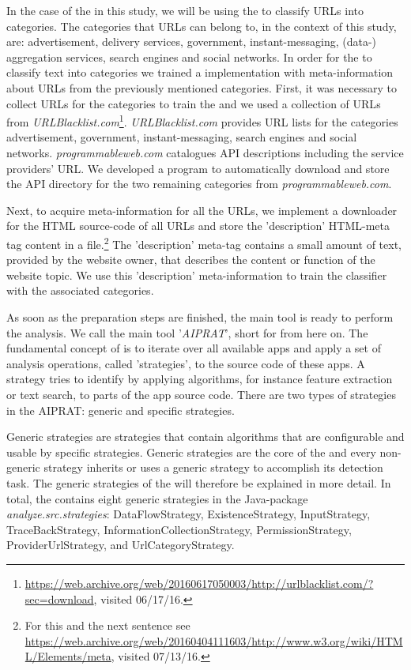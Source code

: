 In the case of the \sca in this study, we will be using the \nbc to classify URLs into categories.
The categories that URLs can belong to, in the context of this study, are: advertisement, delivery services, government, instant-messaging, (data-) aggregation services, search engines and social networks.
In order for the \nbc to classify text into categories we trained a \nbc implementation with meta-information about URLs from the previously mentioned categories.
First, it was necessary to collect URLs for the categories to train the \nbc and we used a collection of \acs{URL}s from \textit{URLBlacklist.com}\footnote{\url{https://web.archive.org/web/20160617050003/http://urlblacklist.com/?sec=download}, visited 06/17/16.}.
\textit{URLBlacklist.com} provides URL lists for the categories advertisement, government, instant-messaging, search engines and social networks.
\textit{programmableweb.com} catalogues API descriptions including the service providers' URL.
We developed a program to automatically download and store the API directory for the two remaining categories from \textit{programmableweb.com}.

Next, to acquire meta-information for all the URLs, we implement a downloader for the HTML source-code of all URLs and store the 'description' HTML-meta tag content in a file.\footnote{For this and the next sentence see \url{https://web.archive.org/web/20160404111603/http://www.w3.org/wiki/HTML/Elements/meta}, visited 07/13/16.}
The 'description' meta-tag contains a small amount of text, provided by the website owner, that describes the content or function of the website topic.
We use this 'description' meta-information to train the classifier with the associated categories.\newline

As soon as the preparation steps are finished, the main \sca tool is ready to perform the \ipr analysis.
We call the main \sca tool '\textit{AIPRAT}', short for \aiprat from here on.
The fundamental concept of \AIPRAT is to iterate over all available apps and apply a set of analysis operations, called 'strategies', to the source code of these apps.
A strategy tries to identify \iprfs by applying algorithms, for instance feature extraction or text search, to parts of the app source code.
There are two types of strategies in the AIPRAT: generic and specific strategies.

Generic strategies are strategies that contain algorithms that are configurable and usable by specific strategies.
Generic strategies are the core of the \aiprat and every non-generic strategy inherits or uses a generic strategy to accomplish its \ipr detection task.
The generic strategies of the \aiprat will therefore be explained in more detail.
In total, the \aiprat contains eight generic strategies in the Java-package \textit{analyze.src.strategies}: DataFlowStrategy, ExistenceStrategy, InputStrategy, TraceBackStrategy, InformationCollectionStrategy, PermissionStrategy, ProviderUrlStrategy, and UrlCategoryStrategy.


